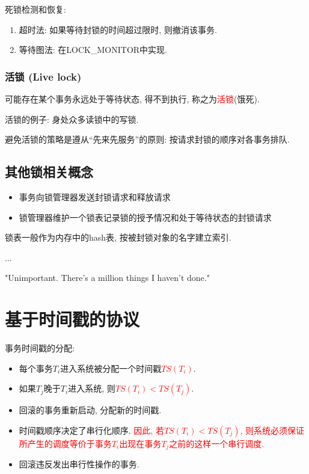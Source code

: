 死锁检测和恢复: 
\begin{enumerate}
    \item 超时法: 如果等待封锁的时间超过限时, 则撤消该事务.
    \item 等待图法: 在LOCK\_MONITOR中实现.
\end{enumerate}

\subsubsection{活锁 (Live lock)}

\begin{definition}
  可能存在某个事务永远处于等待状态, 得不到执行, 称之为\textcolor{red}{活锁}(饿死).
\end{definition}

活锁的例子: 身处众多读锁中的写锁.

避免活锁的策略是遵从“先来先服务”的原则: 按请求封锁的顺序对各事务排队.

\subsection{其他锁相关概念}

\begin{definition}[锁管理器]
  \begin{itemize}
    \item 事务向锁管理器发送封锁请求和释放请求
    \item 锁管理器维护一个锁表记录锁的授予情况和处于等待状态的封锁请求
  \end{itemize}
\end{definition}

\begin{definition}[锁表]
  锁表一般作为内存中的hash表, 按被封锁对象的名字建立索引.
\end{definition}

...

"Unimportant. There's a million things I haven't done."

\section{基于时间戳的协议}

事务时间戳的分配:
\begin{itemize}
  \item 每个事务$T_i$进入系统被分配一个时间戳\textcolor{red}{$TS(T_i)$}.
  \item 如果$T_j$晚于$T_i$进入系统, 则\textcolor{red}{$TS(T_i)<TS(T_j)$}.
  \item 回滚的事务重新启动, 分配新的时间戳.
  \item 时间戳顺序决定了串行化顺序. \textcolor{red}{因此, 若$TS(T_i)<TS(T_j)$, 则系统必须保证所产生的调度等价于事务$T_i$出现在事务$T_j$之前的这样一个串行调度.}
  \item 回滚违反发出串行性操作的事务.
\end{itemize}

